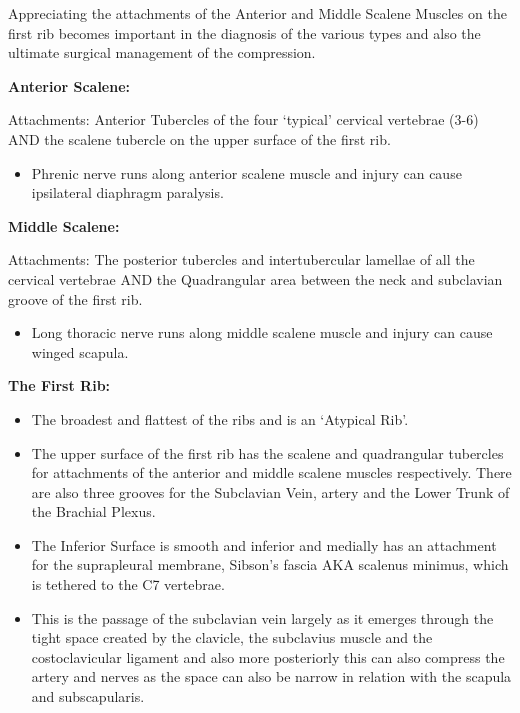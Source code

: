 \documentclass[
]{book}
\providecommand{\tightlist}{%
  \setlength{\itemsep}{0pt}\setlength{\parskip}{0pt}}
\begin{document}
Appreciating the attachments of the Anterior and Middle Scalene Muscles
on the first rib becomes important in the diagnosis of the various types
and also the ultimate surgical management of the compression.

\textbf{Anterior Scalene:}

Attachments: Anterior Tubercles of the four `typical' cervical vertebrae
(3-6) AND the scalene tubercle on the upper surface of the first rib.

\begin{itemize}
\tightlist
\item
  Phrenic nerve runs along anterior scalene muscle and injury can
  cause ipsilateral diaphragm paralysis.
\end{itemize}

\textbf{Middle Scalene:}

Attachments: The posterior tubercles and intertubercular lamellae of all
the cervical vertebrae AND the Quadrangular area between the neck and
subclavian groove of the first rib. \citep{mcminnLastAnatomyRegional2019}

\begin{itemize}
\tightlist
\item
  Long thoracic nerve runs along middle scalene muscle and injury can
  cause winged scapula.
\end{itemize}

\textbf{The First Rib:}

\begin{itemize}
\item
  The broadest and flattest of the ribs and is an `Atypical Rib'.
\item
  The upper surface of the first rib has the scalene and quadrangular
  tubercles for attachments of the anterior and middle scalene muscles
  respectively. There are also three grooves for the Subclavian Vein,
  artery and the Lower Trunk of the Brachial Plexus.
\item
  The Inferior Surface is smooth and inferior and medially has an
  attachment for the suprapleural membrane, Sibson's fascia AKA
  scalenus minimus, which is tethered to the C7 vertebrae.
\item
  This is the passage of the subclavian vein largely as it emerges
  through the tight space created by the clavicle, the subclavius
  muscle and the costoclavicular ligament and also more posteriorly
  this can also compress the artery and nerves as the space can also
  be narrow in relation with the scapula and subscapularis.
  \citep{garygwindAnatomicExposuresVascular2013}
\end{itemize}
\end{document}
